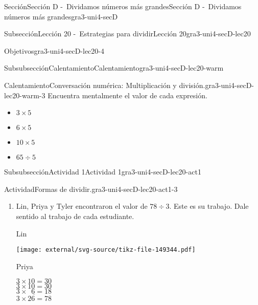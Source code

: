 \documentclass[twoside,10pt,]{article}
\begin{document}
\begin{sectionptx}{Sección}{Sección D -~Dividamos números más grandes}{}{Sección D -~Dividamos números más grandes}{}{}{gra3-uni4-secD}
\begin{subsectionptx}{Subsección}{Lección 20 -~Estrategias para dividir}{}{Lección 20}{}{}{gra3-uni4-secD-lec20}
\begin{objectives}{Objetivos}{gra3-uni4-secD-lec20-4}
\end{objectives}
%
%
\typeout{************************************************}
\typeout{************************************************}
%
\begin{subsubsectionptx}{Subsubsección}{Calentamiento}{}{Calentamiento}{}{}{gra3-uni4-secD-lec20-warm}
\begin{exploration}{Calentamiento}{Conversación numérica: Multiplicación y división.}{gra3-uni4-secD-lec20-warm-3}%
Encuentra mentalmente el valor de cada expresión.%
%
\begin{itemize}[label=\textbullet]
\item{}\(\displaystyle 3\times 5\)%
\item{}\(\displaystyle 6\times 5\)%
\item{}\(\displaystyle 10\times 5\)%
\item{}\(\displaystyle 65\div 5\)%
\end{itemize}
\end{exploration}%
\end{subsubsectionptx}
%
%
\typeout{************************************************}
\typeout{************************************************}
%
\begin{subsubsectionptx}{Subsubsección}{Actividad 1}{}{Actividad 1}{}{}{gra3-uni4-secD-lec20-act1}
\begin{activity}{Actividad}{Formas de dividir.}{gra3-uni4-secD-lec20-act1-3}%
%
\begin{enumerate}
\item{}Lin, Priya y Tyler encontraron el valor de \(78 \div 3\). Este es su trabajo. Dale sentido al trabajo de cada estudiante.%
\par
Lin%
\par
\begin{image}{0}{1}{0}{}%
\texttt{[image: external/svg-source/tikz-file-149344.pdf]}
\end{image}%
%
\begin{sidebyside}{2}{0}{0}{0}%
\begin{sbspanel}{0.5}%
Priya%
\par
\(3\times 10 = 30\)\\
 \(3\times 10 = 30\)\\
 \(3\times \phantom{0}6 = 18\)\\
 \(\overline {3 \times 26 =78}\)%
\end{sbspanel}%
\begin{sbspanel}{0.5}%

\end{sbspanel}
\end{sidebyside}
\end{enumerate}
\end{activity}
\end{subsubsectionptx}
\end{subsectionptx}
\end{sectionptx}
\end{document}
